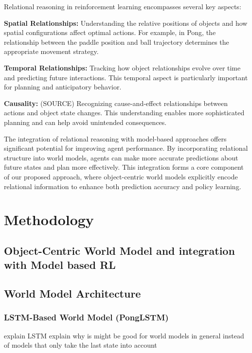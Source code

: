 \documentclass[
	english,
	ruledheaders=section,
	class=report,
	thesis={type=master},
	accentcolor=9c,
	custommargins=true,
	marginpar=false,
	parskip=half-,
	fontsize=11pt,
]{tudapub}
\begin{document}
Relational reasoning in reinforcement learning encompasses several key aspects:

\textbf{Spatial Relationships:} Understanding the relative positions of objects and how spatial configurations affect optimal actions. For example, in Pong, the relationship between the paddle position 
and ball trajectory determines the appropriate movement strategy.

\textbf{Temporal Relationships:} Tracking how object relationships evolve over time and predicting future interactions. This temporal aspect is particularly important for planning and anticipatory behavior.

\textbf{Causality:} (SOURCE) Recognizing cause-and-effect relationships between actions and object state changes. This understanding enables more sophisticated planning and can help avoid unintended consequences.

The integration of relational reasoning with model-based approaches offers significant potential for improving agent performance. By incorporating relational structure into world models, agents can make more 
accurate predictions about future states and plan more effectively. This integration forms a core component of our proposed approach, where object-centric world models explicitly encode relational information to enhance both prediction accuracy and policy learning.



\chapter{Methodology}
\label{chap:methodology}



\section{Object-Centric World Model and integration with Model based RL}
\label{sec:oc_world_model}




\section{World Model Architecture}
\label{sec:world_model_arch}


\subsection{LSTM-Based World Model (PongLSTM)}
\label{subsec:ponglstm}
explain LSTM
explain why is might be good for world models in general instead of models that only take the last state into account
\end{document}
